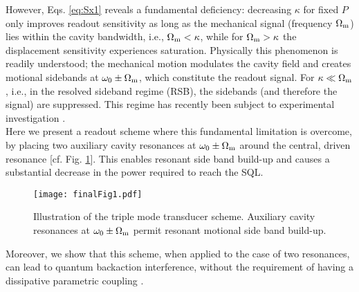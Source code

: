 \documentclass[twocolumn,english,aps,prl,superscriptaddress,showpacs,preprintnumbers]{revtex4}
\begin{document}
However, Eqs. \ref{eq:Sx1} reveals a fundamental deficiency: decreasing
$\kappa$ for fixed $P$ only improves readout sensitivity as long as 
the mechanical signal (frequency $\Omega_{\rm{m}}$) lies within the cavity bandwidth, 
i.e., $\Omega_{\rm{m}}<\kappa$, while for $\Omega_{\rm{m}}>\kappa$ the displacement
sensitivity experiences saturation. Physically this phenomenon is
readily understood; the mechanical motion modulates the cavity field
and creates motional sidebands at $\omega_{0}\pm\Omega_{\rm{m}}$, which constitute
the readout signal. For $\kappa\ll\Omega_{\rm{m}}$, i.e., in the resolved
sideband regime (RSB), the sidebands (and therefore the signal) are
suppressed. This regime has recently been subject to experimental 
investigation \citep{schliesser_resolved-sideband_2008,teufel_nanomechanical_2009}.\\
Here we present a readout scheme where this fundamental limitation is overcome,
by placing two auxiliary cavity resonances at $\omega_{0}\pm\Omega_{\rm{m}}$
around the central, driven resonance [cf. Fig. \ref{fig:intro}]. 
This enables resonant side band build-up and causes a substantial decrease in the power required
to reach the SQL. \begin{figure}[ptb]
\begin{centering}
\texttt{[image: finalFig1.pdf]} 
\par\end{centering}

\caption{Illustration of the triple mode transducer scheme. Auxiliary cavity
resonances at $\omega_{0}\pm\Omega_{\rm{m}}$ permit resonant motional side band
build-up. \label{fig:intro}}

\end{figure}
Moreover, we show that this scheme, when applied to the case of two
resonances, can lead to quantum backaction interference, without the
requirement of having a dissipative parametric coupling \cite{elste_quantum_2009}. 
\end{document}
